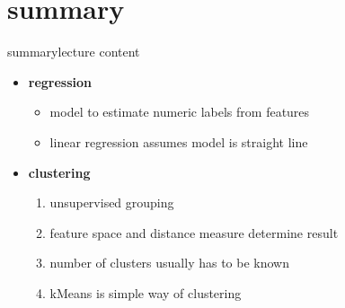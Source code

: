     \section{summary}
        \begin{frame}{summary}{lecture content}
            \begin{itemize}
                \item   \textbf{regression}
                    \begin{itemize}
                        \item   model to estimate numeric labels from features
                        \item   linear regression assumes model is straight line
                    \end{itemize}
                \bigskip
                \item   \textbf{clustering}
                    \begin{enumerate}
                        \item   unsupervised grouping
                        \item   feature space and distance measure determine result
                        \item   number of clusters usually has to be known
                        \item   kMeans is simple way of clustering
                    \end{enumerate}
            \end{itemize}
        \end{frame}


